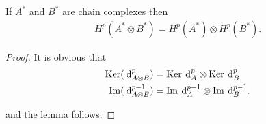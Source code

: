 \begin{lemma}\label{lemma:4-13}
  If $A^*$ and $B^*$ are chain complexes then 
  \begin{align*}
    H^p(A^*\otimes B^*) = H^p(A^*)\otimes H^p(B^*).
  \end{align*}
\end{lemma}

\begin{proof}
  It is obvious that 
  \begin{align*}
    \ker(\dd^p_{A\otimes B}) & = \ker\dd^p_A\otimes \ker\dd^p_B \\
    \im(\dd^{p-1}_{A\otimes B}) & = \im\dd^{p-1}_A\otimes \im\dd^{p-1}_B.
  \end{align*}

  and the lemma follows.
\end{proof}















































